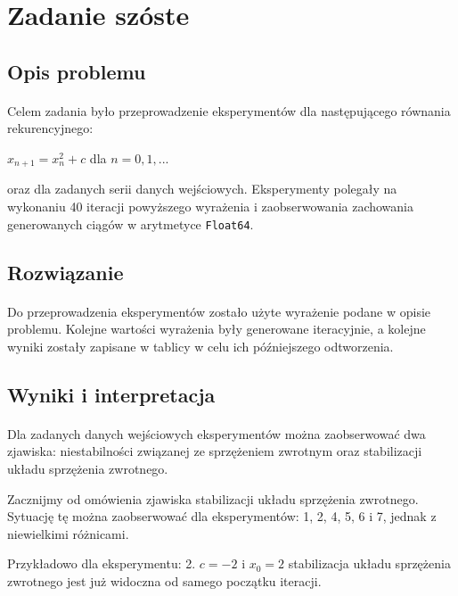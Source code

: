 \documentclass[a4paper]{article}
\begin{document}
\section{Zadanie szóste}

\subsection{Opis problemu}
\paragraph{}
Celem zadania było przeprowadzenie eksperymentów dla następującego równania rekurencyjnego:
\begin{center}
$x_{n + 1} = x_{n}^2 + c$ dla $n = 0, 1, ...$
\end{center}

oraz dla zadanych serii danych wejściowych. Eksperymenty polegały na wykonaniu 40 iteracji powyższego wyrażenia i zaobserwowania zachowania generowanych ciągów w arytmetyce \texttt{Float64}.

\subsection{Rozwiązanie}
\paragraph{}
Do przeprowadzenia eksperymentów zostało użyte wyrażenie podane w opisie problemu. Kolejne wartości wyrażenia były generowane iteracyjnie, a kolejne wyniki zostały zapisane w tablicy w celu ich późniejszego odtworzenia.

\subsection{Wyniki i interpretacja}
\paragraph{}
Dla zadanych danych wejściowych eksperymentów można zaobserwować dwa zjawiska: niestabilności związanej ze sprzężeniem zwrotnym oraz stabilizacji układu sprzężenia zwrotnego.

Zacznijmy od omówienia zjawiska stabilizacji układu sprzężenia zwrotnego. Sytuację tę można zaobserwować dla eksperymentów: 1, 2, 4, 5, 6 i 7, jednak z niewielkimi różnicami.

Przykładowo dla eksperymentu: 2. $c = -2$ i $x_{0} = 2$ stabilizacja układu sprzężenia zwrotnego jest już widoczna od samego początku iteracji.
\end{document}
